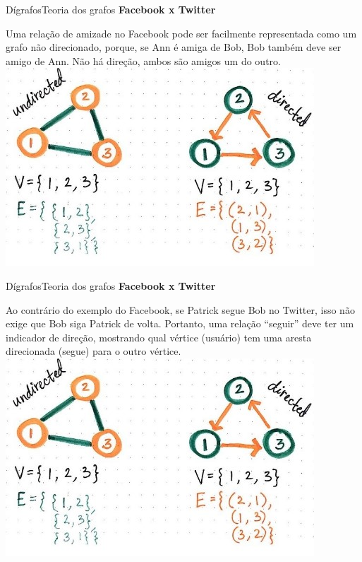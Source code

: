 \documentclass[t]{beamer}
\begin{document}

\begin{ftst}{Dígrafos}{Teoria dos grafos}
\centering
\textbf{Facebook x Twitter}

\vone
\justifying
Uma relação de amizade no Facebook pode ser facilmente representada como um grafo não direcionado, porque, se Ann é amiga de Bob, Bob também deve ser amigo de Ann. Não há direção, ambos são amigos um do outro.
\vone
\centering
\includegraphics[scale=0.6]{Figuras/digrafo.jpg}\\

\end{ftst}


\begin{ftst}{Dígrafos}{Teoria dos grafos}
\centering
\textbf{Facebook x Twitter}

\vone
\justifying
Ao contrário do exemplo do Facebook, se Patrick segue Bob no Twitter, isso não exige que Bob siga Patrick de volta. Portanto, uma relação “seguir” deve ter um indicador de direção, mostrando qual vértice (usuário) tem uma aresta direcionada (segue) para o outro vértice.
\vone
\centering
\includegraphics[scale=0.6]{Figuras/digrafo.jpg}\\

\end{ftst}
\end{document}
